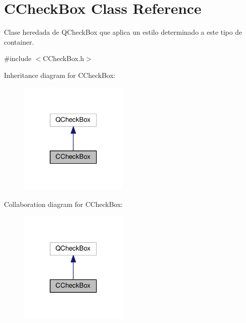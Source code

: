 \hypertarget{classCCheckBox}{}\section{C\+Check\+Box Class Reference}
\label{classCCheckBox}


Clase heredada de \textquotesingle{}Q\+Check\+Box\textquotesingle{} que aplica un estilo determinado a este tipo de container.  




{\ttfamily \#include $<$C\+Check\+Box.\+h$>$}



Inheritance diagram for C\+Check\+Box\+:\nopagebreak
\begin{figure}[H]
\begin{center}
\leavevmode
\includegraphics[width=150pt]{classCCheckBox__inherit__graph}
\end{center}
\end{figure}


Collaboration diagram for C\+Check\+Box\+:\nopagebreak
\begin{figure}[H]
\begin{center}
\leavevmode
\includegraphics[width=150pt]{classCCheckBox__coll__graph}
\end{center}
\end{figure}
